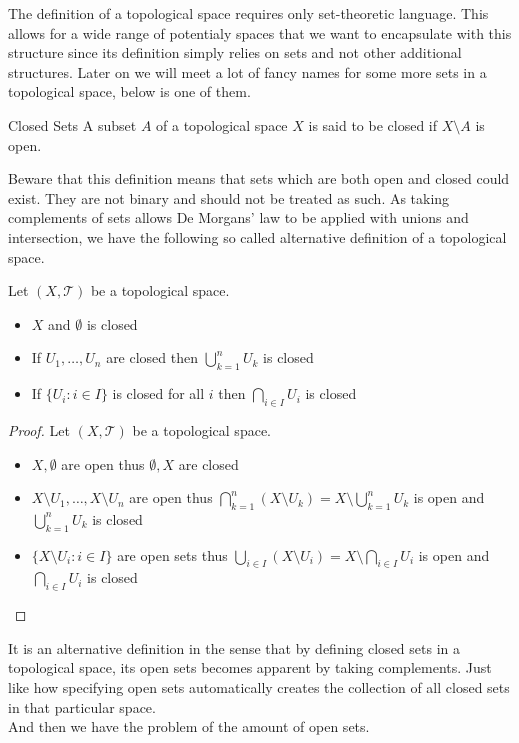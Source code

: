 \documentclass[a4paper]{article}
\begin{document}
The definition of a topological space requires only set-theoretic language. This allows for a wide range of potentialy spaces that we want to encapsulate with this structure since its definition simply relies on sets and not other additional structures. Later on we will meet a lot of fancy names for some more sets in a topological space, below is one of them. 

\begin{defn}{Closed Sets}{} A subset $A$ of a topological space $X$ is said to be closed if $X\setminus A$ is open. 
\end{defn}

Beware that this definition means that sets which are both open and closed could exist. They are not binary and should not be treated as such. As taking complements of sets allows De Morgans' law to be applied with unions and intersection, we have the following so called alternative definition of a topological space. 

\begin{prp}{}{} Let $(X,\mathcal{T})$ be a topological space. 
\begin{itemize}
\item $X$ and $\emptyset$ is closed
\item If $U_1,\dots,U_n$ are closed then $\bigcup_{k=1}^nU_k$ is closed
\item If $\{U_i:i\in I\}$ is closed for all $i$ then $\bigcap_{i\in I}U_i$ is closed
\end{itemize}\tcbline
\begin{proof}
Let $(X,\mathcal{T})$ be a topological space. 
\begin{itemize}
\item $X,\emptyset$ are open thus $\emptyset,X$ are closed
\item $X\setminus U_1,\dots,X\setminus U_n$ are open thus $\bigcap_{k=1}^n(X\setminus U_k)=X\setminus\bigcup_{k=1}^nU_k$ is open and $\bigcup_{k=1}^nU_k$ is closed
\item $\{X\setminus U_i:i\in I\}$ are open sets thus $\bigcup_{i\in I}(X\setminus U_i)=X\setminus\bigcap_{i\in I}U_i$ is open and $\bigcap_{i\in I}U_i$ is closed
\end{itemize}
\end{proof}
\end{prp}

It is an alternative definition in the sense that by defining closed sets in a topological space, its open sets becomes apparent by taking complements. Just like how specifying open sets automatically creates the collection of all closed sets in that particular space. \\
And then we have the problem of the amount of open sets. 
\end{document}
